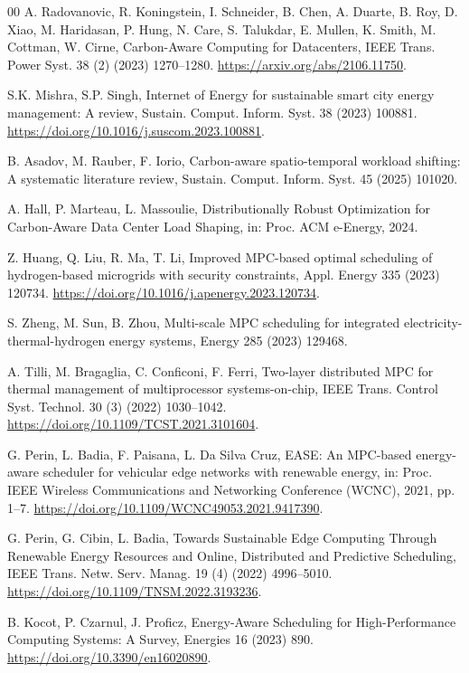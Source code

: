 \documentclass[a4paper,fleqn]{cas-dc}
\begin{document}
\begin{thebibliography}{00}
A. Radovanovic, R. Koningstein, I. Schneider, B. Chen, A. Duarte, B. Roy, D. Xiao, M. Haridasan, P. Hung, N. Care, S. Talukdar, E. Mullen, K. Smith, M. Cottman, W. Cirne, Carbon-Aware Computing for Datacenters, IEEE Trans. Power Syst. 38 (2) (2023) 1270--1280. \url{https://arxiv.org/abs/2106.11750}.

S.K. Mishra, S.P. Singh, Internet of Energy for sustainable smart city energy management: A review, Sustain. Comput. Inform. Syst. 38 (2023) 100881. \url{https://doi.org/10.1016/j.suscom.2023.100881}.

B. Asadov, M. Rauber, F. Iorio, Carbon-aware spatio-temporal workload shifting: A systematic literature review, Sustain. Comput. Inform. Syst. 45 (2025) 101020.

A. Hall, P. Marteau, L. Massoulie, Distributionally Robust Optimization for Carbon-Aware Data Center Load Shaping, in: Proc. ACM e-Energy, 2024.

Z. Huang, Q. Liu, R. Ma, T. Li, Improved MPC-based optimal scheduling of hydrogen-based microgrids with security constraints, Appl. Energy 335 (2023) 120734. \url{https://doi.org/10.1016/j.apenergy.2023.120734}.

S. Zheng, M. Sun, B. Zhou, Multi-scale MPC scheduling for integrated electricity-thermal-hydrogen energy systems, Energy 285 (2023) 129468.

A. Tilli, M. Bragaglia, C. Conficoni, F. Ferri, Two-layer distributed MPC for thermal management of multiprocessor systems-on-chip, IEEE Trans. Control Syst. Technol. 30 (3) (2022) 1030--1042. \url{https://doi.org/10.1109/TCST.2021.3101604}.

G. Perin, L. Badia, F. Paisana, L. Da Silva Cruz, EASE: An MPC-based energy-aware scheduler for vehicular edge networks with renewable energy, in: Proc. IEEE Wireless Communications and Networking Conference (WCNC), 2021, pp. 1--7. \url{https://doi.org/10.1109/WCNC49053.2021.9417390}.

G. Perin, G. Cibin, L. Badia, Towards Sustainable Edge Computing Through Renewable Energy Resources and Online, Distributed and Predictive Scheduling, IEEE Trans. Netw. Serv. Manag. 19 (4) (2022) 4996--5010. \url{https://doi.org/10.1109/TNSM.2022.3193236}.

B. Kocot, P. Czarnul, J. Proficz, Energy-Aware Scheduling for High-Performance Computing Systems: A Survey, Energies 16 (2023) 890. \url{https://doi.org/10.3390/en16020890}.


\end{thebibliography}
\end{document}
